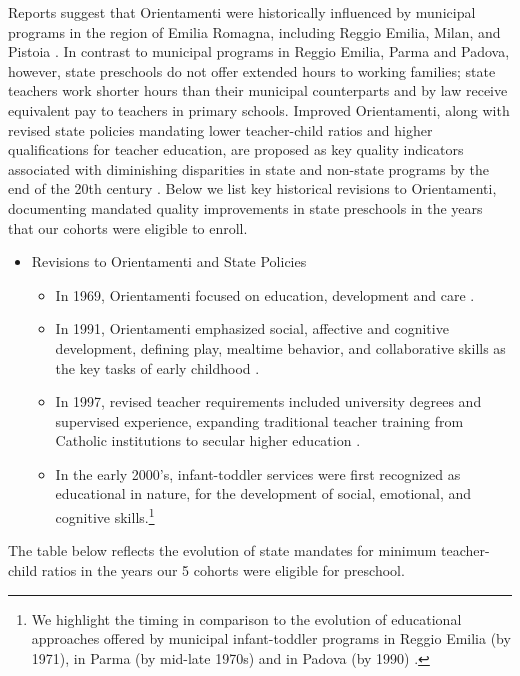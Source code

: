 Reports suggest that Orientamenti were historically influenced by municipal programs in the region of Emilia Romagna, including Reggio Emilia, Milan, and Pistoia \citep{OECD_2001_Italy-Country-Note}. In contrast to municipal programs in Reggio Emilia, Parma and Padova, however, state preschools do not offer extended hours to working families; state teachers work shorter hours than their municipal counterparts and by law receive equivalent pay to teachers in primary schools. Improved Orientamenti, along with revised state policies mandating lower teacher-child ratios and higher qualifications for teacher education, are proposed as key quality indicators associated with diminishing disparities in state and non-state programs by the end of the 20th century \citep{Hohnerlein_2015_Development-and-Diffusion}. Below we list key historical revisions to Orientamenti, documenting mandated quality improvements in state preschools in the years that our cohorts were eligible to enroll.

\begin{itemize}
 \item Revisions to Orientamenti and State Policies 
 \begin{itemize}
 	\item In 1969, Orientamenti focused on education, development and care \citep{Corsaro_1996_Early-Edu,Hohnerlein_2015_Development-and-DiffusionEnrollment}.
	\item In 1991, Orientamenti emphasized social, affective and cognitive development, defining play, mealtime behavior, and collaborative skills as the key tasks of early childhood \citep{Corsaro_1996_Early-Edu}. 
	\item In 1997, revised teacher requirements included university degrees and supervised experience, expanding traditional teacher training from Catholic institutions to secular higher education \citep{Ghedini_2001_Ital-Natl-Policy}. 
	\item In the early 2000's, infant-toddler services were first recognized as educational in nature, for the development of social, emotional, and cognitive skills.\footnote{We highlight the timing in comparison to the evolution of educational approaches offered by municipal infant-toddler programs in Reggio Emilia (by 1971), in Parma (by mid-late 1970s) and in Padova (by 1990) \citep{CEHD_2016_Historical-Analysis}.} 
 \end{itemize}
 \end{itemize}

The table below reflects the evolution of state mandates for minimum teacher-child ratios in the years our 5 cohorts were eligible for preschool. 

